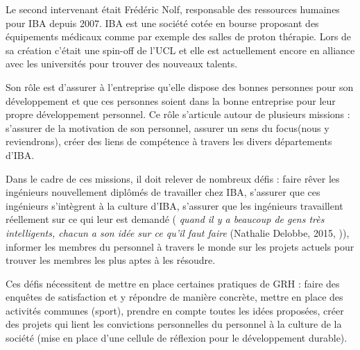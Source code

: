 Le second intervenant était Frédéric Nolf, responsable des ressources humaines pour IBA depuis 2007. IBA est une société cotée en bourse proposant des équipements médicaux comme par exemple des salles de proton thérapie. Lors de sa création c'était une spin-off de l'UCL et elle est actuellement encore en alliance avec les universités pour trouver des nouveaux talents. \newline

Son rôle est d'assurer à l'entreprise qu'elle dispose des bonnes personnes pour son développement et que ces personnes soient dans la bonne entreprise pour leur propre développement personnel. Ce rôle s'articule autour de plusieurs missions : s'assurer de la motivation de son personnel, assurer un \og{} sens du focus\fg{}(nous y reviendrons), créer des liens de compétence à travers les divers départements d'IBA. \newline

Dans le cadre de ces missions, il doit relever de nombreux défis : faire rêver les ingénieurs nouvellement diplômés de travailler chez IBA, s'assurer que ces ingénieurs s'intègrent à la culture d'IBA, s'assurer que les ingénieurs travaillent réellement sur ce qui leur est demandé (\textit{\og{} quand il y a beaucoup de gens très intelligents, chacun a son idée sur ce qu'il faut faire \fg{}} (Nathalie Delobbe, 2015, \cite{tableronde})), informer les membres du personnel à travers le monde sur les projets actuels pour trouver les membres les plus aptes à les résoudre. \newline

Ces défis nécessitent de mettre en place certaines pratiques de GRH : faire des enquêtes de satisfaction et y répondre de manière concrète, mettre en place des activités communes (sport), prendre en compte toutes les idées proposées, créer des projets qui lient les convictions personnelles du personnel à la culture de la société (mise en place d'une cellule de réflexion pour le développement durable). \newline